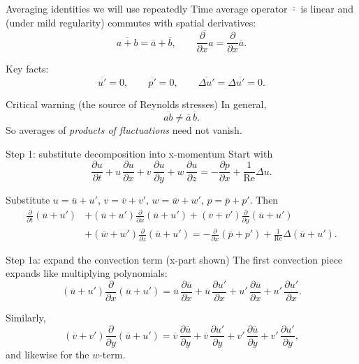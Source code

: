 \documentclass[aspectratio=169,11pt]{beamer}
\newcommand{\Rey}{\mathrm{Re}}
\newcommand{\avg}[1]{\overline{#1}}
\newcommand{\Lap}{\Delta}
\begin{document}
\begin{frame}{Averaging identities we will use repeatedly}
Time average operator $\avg{\cdot}$ is linear and (under mild regularity)
commutes with spatial derivatives:
\[
\avg{a+b}=\avg{a}+\avg{b},\qquad
\avg{\frac{\partial}{\partial x} a}=\frac{\partial}{\partial x} \avg{a}.
\]

Key facts:
\[
\avg{u'}=0,\qquad \avg{p'}=0,\qquad \avg{\Lap u'}=\Lap\avg{u'}=0.
\]

\begin{block}{Critical warning (the source of Reynolds stresses)}
In general,
\[
\avg{ab}\neq \avg{a}\,\avg{b}.
\]
So averages of \emph{products of fluctuations} need not vanish.
\end{block}
\end{frame}

\begin{frame}{Step 1: substitute decomposition into x-momentum}
Start with
\[
\frac{\partial u}{\partial t} + u\,\frac{\partial u}{\partial x} + v\,\frac{\partial u}{\partial y} + w\,\frac{\partial u}{\partial z}
= -\frac{\partial p}{\partial x} + \frac{1}{\Rey}\Lap u.
\]

Substitute $u=\avg{u}+u'$, $v=\avg{v}+v'$, $w=\avg{w}+w'$, $p=\avg{p}+p'$.
Then
\begin{align*}
\frac{\partial} {\partial t}(\avg{u}+u')
&+ (\avg{u}+u')\frac{\partial}{\partial x}(\avg{u}+u')
+ (\avg{v}+v')\frac{\partial}{\partial y}(\avg{u}+u')\\
&+ (\avg{w}+w')\frac{\partial}{\partial z}(\avg{u}+u')
= -\frac{\partial}{\partial x}(\avg{p}+p') + \frac{1}{\Rey}\Lap(\avg{u}+u').
\end{align*}
\end{frame}

\begin{frame}{Step 1a: expand the convection term (x-part shown)}
The first convection piece expands like multiplying polynomials:
\[
(\avg{u}+u')\frac{\partial}{\partial x}(\avg{u}+u')
=
\avg{u}\,\frac{\partial \avg{u}}{\partial x}
+\avg{u}\,\frac{\partial u'}{\partial x}
+u'\,\frac{\partial \avg{u}}{\partial x}
+u'\,\frac{\partial u'}{\partial x}.
\]

Similarly,
\[
(\avg{v}+v')\frac{\partial}{\partial y}(\avg{u}+u')
=
\avg{v}\,\frac{\partial \avg{u}}{\partial y}
+\avg{v}\,\frac{\partial u'}{\partial y}
+v'\,\frac{\partial \avg{u}}{\partial y}
+v'\,\frac{\partial u'}{\partial y},
\]
and likewise for the $w$-term.
\end{frame}
\end{document}
